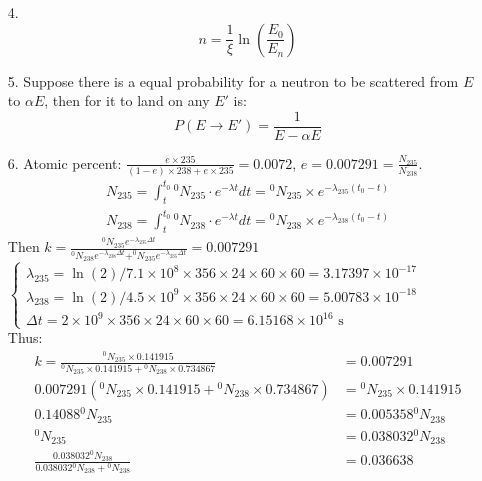 \documentclass{article}
\begin{document}
\begin{itemize}
    \item [4.] \[n = \frac{1}{\xi}\ln\left(\frac{E_0}{E_n}\right)\]
    \item [5.] Suppose there is a equal probability for a neutron to be scattered from \(E\) to \(\alpha E\), then for it to land on any \(E'\) is:
    \[P(E\rightarrow E') = \frac{1}{E-\alpha E}\]
    \item [6.] Atomic percent: \(\displaystyle \frac{e\times235}{(1-e)\times 238 + e\times 235} = 0.0072\), \(e =0.007291 = \frac{N_{235}}{N_{238}}\).\\
    \begin{align*}
        N_{235} =  \int_{t}^{t_0} {}^0N_{235}\cdot e^{-\lambda t} dt={}^0N_{235} \times e^{-\lambda_{235} (t_0-t)}\\
        N_{238} =  \int_{t}^{t_0} {}^0N_{238}\cdot e^{-\lambda t} dt={}^0N_{238} \times e^{-\lambda_{238} (t_0-t)}
    \end{align*}
    Then \(\displaystyle k =  \frac{^0N_{235}e^{-\lambda_{235} \Delta t}}{^0N_{238}e^{-\lambda_{238} \Delta t}+^0N_{235}e^{-\lambda_{235} \Delta t}} = 0.007291\)\\
    \(\displaystyle \left\{ 
    \begin{matrix}
        \lambda_{235} = \ln(2)/7.1\times 10^8 \times 356 \times 24\times 60\times 60 = 3.17397\times 10^{-17} \\
        \lambda_{238} = \ln(2)/4.5\times 10^9 \times 356 \times 24\times 60\times 60 = 5.00783\times 10^{-18} \\
        \Delta t = 2\times 10^9 \times 356 \times 24\times 60\times 60 =6.15168\times 10^{16} \text{ s}
    \end{matrix}
    \right.\)\\
    Thus: \(\)
    \begin{align*}
        k = \frac{^0N_{235}\times 0.141915}{{}^0N_{235}\times 0.141915+ {}^0N_{238}\times 0.734867} &= 0.007291\\
        0.007291(^0N_{235}\times 0.141915+ {}^0N_{238}\times 0.734867)&={}^0N_{235}\times 0.141915\\
        0.14088 {}^0N_{235} & = 0.005358{}^0N_{238}\\
        {}^0N_{235}&  =0.038032{}^0N_{238}\\
        \frac{0.038032{}^0N_{238}}{0.038032{}^0N_{238}+{}^0N_{238}}&=0.036638
    \end{align*}
\end{itemize}
\end{document}
